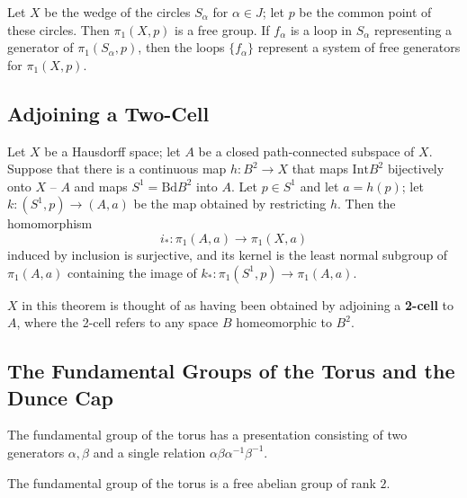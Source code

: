 \begin{theorem*}[71.3]
    Let $X$ be the wedge of the circles $S_\alpha$ for $\alpha \in J$; let $p$ be the common point of these circles. Then $\pi_1(X, p)$ is a free group. If $f_\alpha$ is a loop in $S_\alpha$ 
    representing a generator of $\pi_1(S_\alpha, p)$, then the loops $\{ f_\alpha \} $ represent a system of free generators for $\pi_1(X, p)$.
\end{theorem*}


\subsection{Adjoining a Two-Cell}

\begin{theorem}
Let $X$ be a Hausdorff space; let $A$ be a closed path-connected subspace of $X$. Suppose that there is a continuous map $h\colon B^2 \rightarrow X$ that maps $\mathrm{Int} B^2$
bijectively onto $X \text{ -- } A$ and maps $S^1 = \mathrm{Bd} B^2$ into $A$. Let $p \in S^1$ and let $a = h(p)$; let $k\colon (S^1, p) \rightarrow (A, a)$ be the map obtained by restricting $h$.
Then the homomorphism
\[
    i_{\ast} \colon \pi_1(A, a) \rightarrow \pi_1(X, a)
\]  
induced by inclusion is surjective, and its kernel is the least normal subgroup of $\pi_1(A, a)$ containing the image of $k_{\ast} \colon \pi_1(S^1, p) \rightarrow \pi_1(A, a)$.
\end{theorem}

\begin{remark}
$X$ in this theorem is thought of as having been obtained by adjoining a \textbf{2-cell} to $A$, where the 2-cell refers to any space $B$ homeomorphic to $B^2$.
\end{remark}

\subsection{The Fundamental Groups of the Torus and the Dunce Cap}

\begin{theorem}
The fundamental group of the torus has a presentation consisting of two generators $\alpha, \beta$ and a single relation $\alpha\beta\alpha^{-1}\beta^{-1}$.
\end{theorem}

\begin{corollary}
The fundamental group of the torus is a free abelian group of rank $2$.
\end{corollary}

